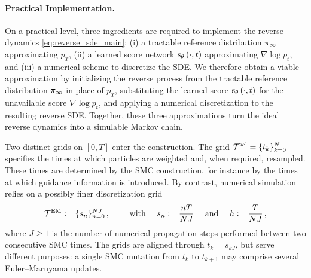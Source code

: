 \documentclass[11pt]{article}
\theoremstyle{plain}
\theoremstyle{definition}
\theoremstyle{remark}
\begin{document}
\paragraph{Practical Implementation.}
On a practical level, three ingredients are required to implement the reverse dynamics \eqref{eq:reverse_sde_main}: (i) a tractable reference distribution $\pi_{\infty}$ approximating $p_T$, (ii) a learned score network $\scorenet[t][\cdot][\theta]$ approximating $\nabla\log p_t$, and (iii) a numerical scheme to discretize the SDE. We therefore obtain a viable approximation by initializing the reverse process from the tractable reference distribution $\pi_{\infty}$ in place of $p_T$, substituting the learned score $\scorenet[t][\cdot][\theta]$ for the unavailable score $\nabla\log p_t$, and applying a numerical discretization to the resulting reverse SDE. Together, these three approximations turn the ideal reverse dynamics into a simulable Markov chain.

Two distinct grids on $[0,T]$ enter the construction. The grid $\mathcal T^{\rm sel}=\{t_k\}_{k=0}^N$ specifies the times at which particles are weighted and, when required, resampled. These times are
determined by the SMC construction, for instance by the times at which guidance information is introduced. By contrast, numerical simulation relies on a possibly finer discretization grid
$$
\mathcal T^{\rm EM}:=\{s_n\}_{n=0}^{NJ} \,, \qquad \text{ with } \quad s_n:=\frac{nT}{NJ} \quad \text{ and } \quad h:=\frac{T}{NJ} \,,
$$
where $J\geq1$ is the number of numerical propagation steps performed between two consecutive SMC times. The grids are aligned through $t_k=s_{kJ}$, but serve different purposes: a single SMC mutation from $t_k$ to $t_{k+1}$ may comprise several Euler--Maruyama updates.
\end{document}
